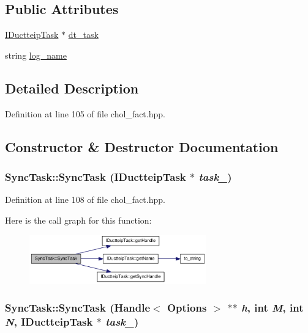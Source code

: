 \subsection*{Public Attributes}
\begin{DoxyCompactItemize}
\item 
\hyperlink{class_i_ductteip_task}{IDuctteipTask} $\ast$ \hyperlink{struct_sync_task_ac74c54d4b27aad281e0334bd9324c6eb}{dt\_\-task}
\item 
string \hyperlink{struct_sync_task_a188973a0f83d6e5fa9d0d43b1ec4473e}{log\_\-name}
\end{DoxyCompactItemize}


\subsection{Detailed Description}


Definition at line 105 of file chol\_\-fact.hpp.

\subsection{Constructor \& Destructor Documentation}
\hypertarget{struct_sync_task_a3ebb63e8654c8892c1ff2262e4ab345b}{
\subsubsection[{SyncTask}]{\setlength{\rightskip}{0pt plus 5cm}SyncTask::SyncTask ({\bf IDuctteipTask} $\ast$ {\em task\_\-})}}
\label{struct_sync_task_a3ebb63e8654c8892c1ff2262e4ab345b}


Definition at line 108 of file chol\_\-fact.hpp.

Here is the call graph for this function:\nopagebreak
\begin{figure}[H]
\begin{center}
\leavevmode
\includegraphics[width=217pt]{struct_sync_task_a3ebb63e8654c8892c1ff2262e4ab345b_cgraph}
\end{center}
\end{figure}
\hypertarget{struct_sync_task_a5bb3343352ebd177a3f8b71e048db67e}{
\subsubsection[{SyncTask}]{\setlength{\rightskip}{0pt plus 5cm}SyncTask::SyncTask (Handle$<$ {\bf Options} $>$ $\ast$$\ast$ {\em h}, \/  int {\em M}, \/  int {\em N}, \/  {\bf IDuctteipTask} $\ast$ {\em task\_\-})}}
\label{struct_sync_task_a5bb3343352ebd177a3f8b71e048db67e}


